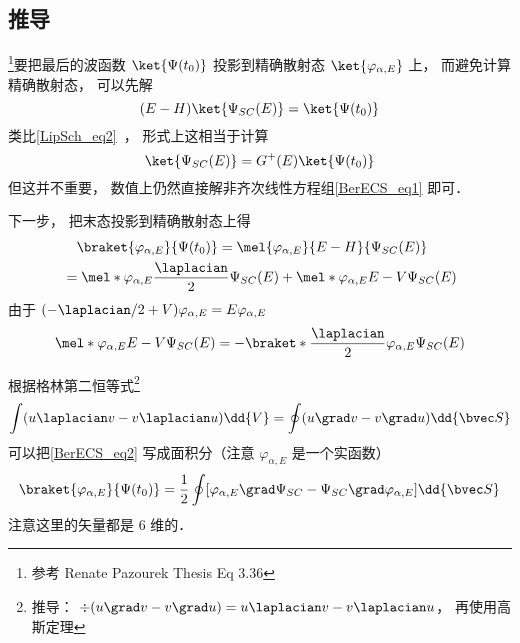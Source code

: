 
\begin{issues}
\issueDraft
\end{issues}


\subsection{推导}
\footnote{参考 Renate Pazourek Thesis Eq 3.36}要把最后的波函数 $\ket{\Psi(t_0)}$ 投影到精确散射态 $\ket{\varphi_{\alpha,E}}$ 上， 而避免计算精确散射态， 可以先解
\begin{equation}\label{BerECS_eq1}
(E-H)\ket{\Psi_{SC}(E)} = \ket{\Psi(t_0)}
\end{equation}
类比\autoref{LipSch_eq2}~， 形式上这相当于计算
\begin{equation}
\ket{\Psi_{SC}(E)} = G^+(E)\ket{\Psi(t_0)}
\end{equation}
但这并不重要， 数值上仍然直接解非齐次线性方程组\autoref{BerECS_eq1} 即可．

下一步， 把末态投影到精确散射态上得
\begin{equation}\label{BerECS_eq2}
\begin{aligned}
&\quad \braket{\varphi_{\alpha,E}}{\Psi(t_0)} = \mel{\varphi_{\alpha,E}}{E-H}{\Psi_{SC}(E)}\\
&= \mel*{\varphi_{\alpha,E}}{\frac{\laplacian}{2}}{\Psi_{SC}(E)} + \mel*{\varphi_{\alpha,E}}{E-V}{\Psi_{SC}(E)}
\end{aligned}
\end{equation}
由于 $(-\laplacian/2+V)\varphi_{\alpha,E} = E\varphi_{\alpha,E}$
\begin{equation}
\mel*{\varphi_{\alpha,E}}{E-V}{\Psi_{SC}(E)} = -\braket*{\frac{\laplacian}{2} \varphi_{\alpha,E}}{\Psi_{SC}(E)}
\end{equation}

根据格林第二恒等式\footnote{推导： $\div(u\grad v - v\grad u) = u\laplacian v - v\laplacian u$， 再使用高斯定理}
\begin{equation}
\int (u\laplacian v - v\laplacian u)\dd{V} = \oint (u\grad v - v\grad u) \dd{\bvec S}
\end{equation}
可以把\autoref{BerECS_eq2} 写成面积分（注意 $\varphi_{\alpha,E}$ 是一个实函数）
\begin{equation}\label{BerECS_eq3}
\braket{\varphi_{\alpha,E}}{\Psi(t_0)} = \frac{1}{2} \oint [\varphi_{\alpha,E} \grad \Psi_{SC} - \Psi_{SC} \grad \varphi_{\alpha,E}] \dd{\bvec S}
\end{equation}
注意这里的矢量都是 6 维的．

